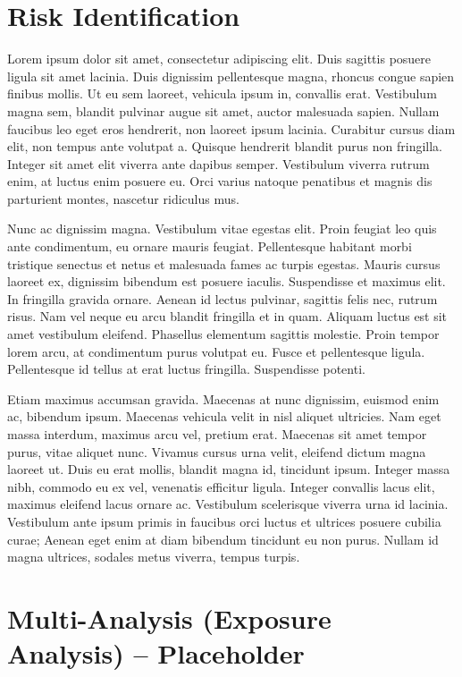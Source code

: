 \documentclass[
  letterpaper,
  DIV=11,
  numbers=noendperiod]{scrreprt}
\begin{document}
\chapter{Risk Identification}\label{risk-identification}

Lorem ipsum dolor sit amet, consectetur adipiscing elit. Duis sagittis
posuere ligula sit amet lacinia. Duis dignissim pellentesque magna,
rhoncus congue sapien finibus mollis. Ut eu sem laoreet, vehicula ipsum
in, convallis erat. Vestibulum magna sem, blandit pulvinar augue sit
amet, auctor malesuada sapien. Nullam faucibus leo eget eros hendrerit,
non laoreet ipsum lacinia. Curabitur cursus diam elit, non tempus ante
volutpat a. Quisque hendrerit blandit purus non fringilla. Integer sit
amet elit viverra ante dapibus semper. Vestibulum viverra rutrum enim,
at luctus enim posuere eu. Orci varius natoque penatibus et magnis dis
parturient montes, nascetur ridiculus mus.

Nunc ac dignissim magna. Vestibulum vitae egestas elit. Proin feugiat
leo quis ante condimentum, eu ornare mauris feugiat. Pellentesque
habitant morbi tristique senectus et netus et malesuada fames ac turpis
egestas. Mauris cursus laoreet ex, dignissim bibendum est posuere
iaculis. Suspendisse et maximus elit. In fringilla gravida ornare.
Aenean id lectus pulvinar, sagittis felis nec, rutrum risus. Nam vel
neque eu arcu blandit fringilla et in quam. Aliquam luctus est sit amet
vestibulum eleifend. Phasellus elementum sagittis molestie. Proin tempor
lorem arcu, at condimentum purus volutpat eu. Fusce et pellentesque
ligula. Pellentesque id tellus at erat luctus fringilla. Suspendisse
potenti.

Etiam maximus accumsan gravida. Maecenas at nunc dignissim, euismod enim
ac, bibendum ipsum. Maecenas vehicula velit in nisl aliquet ultricies.
Nam eget massa interdum, maximus arcu vel, pretium erat. Maecenas sit
amet tempor purus, vitae aliquet nunc. Vivamus cursus urna velit,
eleifend dictum magna laoreet ut. Duis eu erat mollis, blandit magna id,
tincidunt ipsum. Integer massa nibh, commodo eu ex vel, venenatis
efficitur ligula. Integer convallis lacus elit, maximus eleifend lacus
ornare ac. Vestibulum scelerisque viverra urna id lacinia. Vestibulum
ante ipsum primis in faucibus orci luctus et ultrices posuere cubilia
curae; Aenean eget enim at diam bibendum tincidunt eu non purus. Nullam
id magna ultrices, sodales metus viverra, tempus turpis.

\chapter{Multi-Analysis (Exposure Analysis) --
Placeholder}\label{multi-analysis-exposure-analysis-placeholder}
\end{document}
